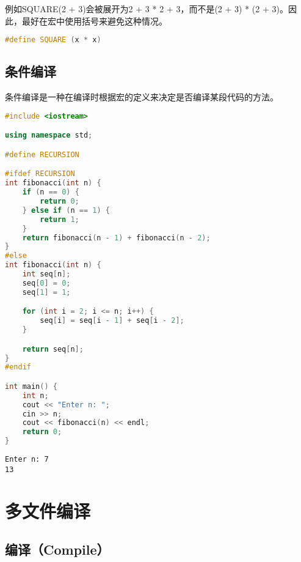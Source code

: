 例如SQUARE(2 + 3)会被展开为2 + 3 * 2 + 3，而不是(2 + 3) * (2 + 3)。因此，最好在宏中使用括号来避免这种情况。

\vspace{-0.5cm}

\begin{lstlisting}[language=C++]
#define SQUARE (x * x)
\end{lstlisting}

\vspace{0.5cm}

\subsection{条件编译}

条件编译是一种在编译时根据宏的定义来决定是否编译某段代码的方法。\\


\begin{lstlisting}[language=C++]
#include <iostream>

using namespace std;

#define RECURSION

#ifdef RECURSION
int fibonacci(int n) {
    if (n == 0) {
        return 0;
    } else if (n == 1) {
        return 1;
    }
    return fibonacci(n - 1) + fibonacci(n - 2);
}
#else
int fibonacci(int n) {
    int seq[n];
    seq[0] = 0;
    seq[1] = 1;

    for (int i = 2; i <= n; i++) {
        seq[i] = seq[i - 1] + seq[i - 2];
    }

    return seq[n];
}
#endif

int main() {
    int n;
    cout << "Enter n: ";
    cin >> n;
    cout << fibonacci(n) << endl;
    return 0;
}
\end{lstlisting}

\begin{tcolorbox}
    \begin{verbatim}
Enter n: 7
13
	\end{verbatim}
\end{tcolorbox}

\newpage

\section{多文件编译}

\subsection{编译（Compile）}

